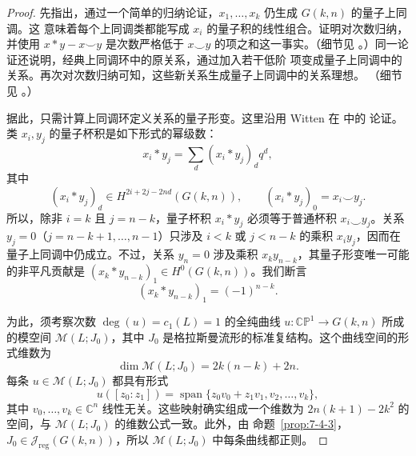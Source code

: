 \begin{proof}
先指出，通过一个简单的归纳论证，$x_1,\ldots,x_k$ 仍生成 $G(k,n)$ 的量子上同调。这
意味着每个上同调类都能写成 $x_i$ 的量子积的线性组合。证明对次数归纳，并使用
$x*y-x\smile y$ 是次数严格低于 $x\smile y$ 的项之和这一事实。（细节见
。）同一论证还说明，经典上同调环中的原关系，通过加入若干低阶
项变成量子上同调中的关系。再次对次数归纳可知，这些新关系生成量子上同调中的关系理想。
（细节见 。）

据此，只需计算上同调环定义关系的量子形变。这里沿用 Witten 在  中的
论证。类 $x_i,y_j$ 的量子杯积是如下形式的幂级数：
\[
  x_i*y_j=\sum_d(x_i*y_j)_dq^d,
\]
其中
\[
  (x_i*y_j)_d\in H^{2i+2j-2nd}(G(k,n)),
  \qquad (x_i*y_j)_0=x_i\smile y_j.
\]
所以，除非 $i=k$ 且 $j=n-k$，量子杯积 $x_i*y_j$ 必须等于普通杯积
$x_i\smile y_j$。关系 $y_j=0$（$j=n-k+1,\ldots,n-1$）只涉及 $i<k$ 或
$j<n-k$ 的乘积 $x_iy_j$，因而在量子上同调中仍成立。不过，关系 $y_n=0$ 涉及乘积
$x_ky_{n-k}$，其量子形变唯一可能的非平凡贡献是
$(x_k*y_{n-k})_1\in H^0(G(k,n))$。我们断言
\begin{equation}\label{eq:11-3-19}
  (x_k*y_{n-k})_1=(-1)^{n-k}.
\end{equation}

为此，须考察次数
$\deg(u)=c_1(L)=1$ 的全纯曲线 $u:\mathbb{CP}^1\to G(k,n)$ 所成的模空间
$\mathcal M(L;J_0)$，其中 $J_0$ 是格拉斯曼流形的标准复结构。这个曲线空间的形式维数为
\[
  \dim\mathcal M(L;J_0)=2k(n-k)+2n.
\]
每条 $u\in\mathcal M(L;J_0)$ 都具有形式
\begin{equation}\label{eq:11-3-20}
  u([z_0:z_1])=\operatorname{span}
  \{z_0v_0+z_1v_1,v_2,\ldots,v_k\},
\end{equation}
其中 $v_0,\ldots,v_k\in\mathbb C^n$ 线性无关。这些映射确实组成一个维数为
$2n(k+1)-2k^2$ 的空间，与 $\mathcal M(L;J_0)$ 的维数公式一致。此外，由
命题~\ref{prop:7-4-3}，$J_0\in\mathcal J_{\mathrm{reg}}(G(k,n))$，所以
$\mathcal M(L;J_0)$ 中每条曲线都正则。


\end{proof}
